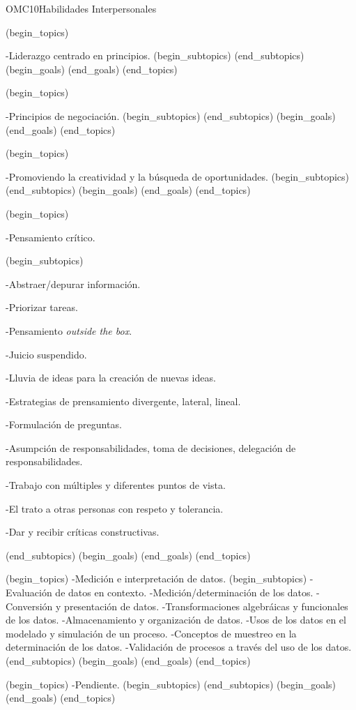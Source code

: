 \begin{BKL2}{OMC10}{Habilidades Interpersonales}
 

(begin_topics)

-Liderazgo centrado en principios.
(begin_subtopics)
(end_subtopics)
(begin_goals)
(end_goals)
(end_topics)

 

(begin_topics)

-Principios de negociación.
(begin_subtopics)
(end_subtopics)
(begin_goals)
(end_goals)
(end_topics)

 

(begin_topics)

-Promoviendo la creatividad y la búsqueda de oportunidades.
(begin_subtopics)
(end_subtopics)
(begin_goals)
(end_goals)
(end_topics)

 

(begin_topics)

-Pensamiento crítico.

(begin_subtopics)

-Abstraer/depurar información.

-Priorizar tareas.

-Pensamiento \textit{outside the box}.

-Juicio suspendido.

-Lluvia de ideas para la creación de nuevas ideas.

-Estrategias de prensamiento divergente, lateral, lineal.

-Formulación de preguntas.

-Asumpción de responsabilidades, toma de decisiones, delegación de responsabilidades.

-Trabajo con múltiples y diferentes puntos de vista.

-El trato a otras personas  con respeto y tolerancia.

-Dar y recibir críticas constructivas.

(end_subtopics)
(begin_goals)
(end_goals)
(end_topics)

 
(begin_topics)
-Medición e interpretación de datos.
(begin_subtopics)
-Evaluación de datos en contexto.
-Medición/determinación de los datos.
-Conversión y presentación de datos.
-Transformaciones algebráicas y funcionales de los datos.
-Almacenamiento y organización de datos.
-Usos de los datos en el modelado y simulación de un proceso.
-Conceptos de muestreo en la determinación de los datos.
-Validación de procesos a través del uso de los datos.
(end_subtopics)
(begin_goals)
(end_goals)
(end_topics)

(begin_topics)
-Pendiente.
(begin_subtopics)
(end_subtopics)
(begin_goals)
(end_goals)
(end_topics)


\end{BKL2}
